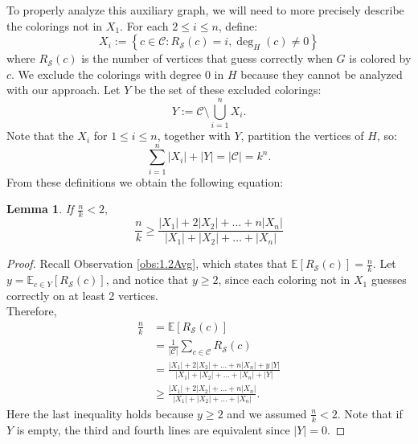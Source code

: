 \documentclass{amsart}
\newcommand{\1}{\mathds{1}}
\newtheorem{lemma}[theorem]{Lemma}
\numberwithin{theorem}{section}
\def\cS{\ensuremath{\mathcal{S}}}
\newcommand{\wXsum}{|X_1|+2|X_2|+\ldots +n|X_n|}
\begin{document}
To properly analyze this auxiliary graph, we will need to more precisely describe the colorings not in $X_1$. For each $2 \leq i \leq n$, define:
$$X_i:= \left\{c \in \mathcal{C}:R_{\cS}(c)=i, \deg_H(c) \neq 0  \right\}$$ 
where $R_{\cS}(c)$ is the number of vertices that guess correctly when $G$ is colored by $c$. We exclude the colorings with degree $0$ in $H$ because they cannot be analyzed with our approach.
Let $Y$ be the set of these excluded colorings:%
$$Y:=\mathcal{C} \setminus \bigcup_{i=1}^n X_i.$$
Note that the $X_i$ for ${1 \leq i \leq n}$, together with $Y$, partition the vertices of $H$, so: $$\sum_{i=1}^n |X_i|+|Y|=|\mathcal C|=k^n.$$
From these definitions we obtain the following equation:
 \begin{lemma}\label{2.2lem:trivialn/k} If $\frac{n}{k} < 2,$
        $$\frac{n}{k} \geq \frac{|X_1|+2|X_2|+\ldots +n|X_n|}{|X_1|+|X_2|+\ldots +|X_n|}$$
    \end{lemma}
    \begin{proof}
       Recall Observation \ref{obs:1.2Avg}, which states that $ \mathbb E[R_\cS (c)]=\frac{n}{k} $. Let $y=\mathbb E_{c\in Y}[R_\mathcal S(c)]$, and notice that $y\geq 2$, since each coloring not in $X_1$ guesses correctly on at least 2 vertices.\\  Therefore, 
        \begin{align*}
             \frac{n}{k} &=\mathbb E[R_\cS (c)] \\
             &=\frac{1}{|\mathcal C|} \sum_{c\in \mathcal C}R_\mathcal S(c) \\
            &=\frac{ \wXsum +y\,|Y|}{|X_1|+|X_2|+\ldots +|X_n|+|Y|}  \\
             &\geq \frac{|X_1|+2|X_2|+\ldots+ n|X_n|}{|X_1|+|X_2|+\ldots+ |X_n|}.
        \end{align*}
        Here the last inequality holds because $y\geq 2$ and we assumed $\frac{n}{k}< 2$. Note that if $Y$ is empty, the third and fourth lines are equivalent since $|Y|=0$.
    \end{proof}
\end{document}
